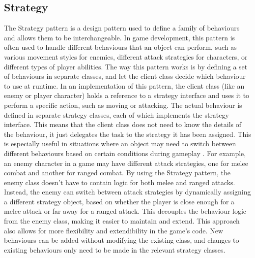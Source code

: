 \documentclass[10pt]{final_report}
\begin{document}
\subsection{Strategy}\label{strategy}
The Strategy pattern is a design pattern used to define a family of behaviours and allows them to be interchangeable. In game development, this pattern is often used to handle different behaviours that an object can perform, such as various movement styles for enemies, different attack strategies for characters, or different types of player abilities. The way this pattern works is by defining a set of behaviours in separate classes, and let the client class decide which behaviour to use at runtime.
\newline
In an implementation of this pattern, the client class (like an enemy or player character) holds a reference to a strategy interface and uses it to perform a specific action, such as moving or attacking. The actual behaviour is defined in separate strategy classes, each of which implements the strategy interface. This means that the client class does not need to know the details of the behaviour, it just delegates the task to the strategy it has been assigned. This is especially useful in situations where an object may need to switch between different behaviours based on certain conditions during gameplay \cite{Doran2017}.
\newline
For example, an enemy character in a game may have different attack strategies, one for melee combat and another for ranged combat. By using the Strategy pattern, the enemy class doesn’t have to contain logic for both melee and ranged attacks. Instead, the enemy can switch between attack strategies by dynamically assigning a different strategy object, based on whether the player is close enough for a melee attack or far away for a ranged attack. This decouples the behaviour logic from the enemy class, making it easier to maintain and extend. This approach also allows for more flexibility and extendibility in the game's code. New behaviours can be added without modifying the existing class, and changes to existing behaviours only need to be made in the relevant strategy classes. 
\end{document}
